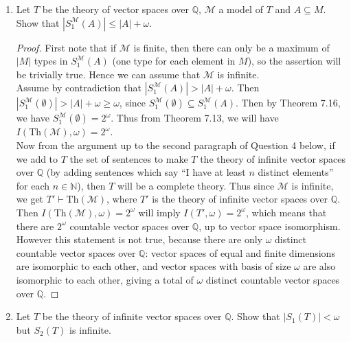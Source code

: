 \documentclass{article}
\begin{document}
\begin{enumerate}[label={\bf Q\arabic*:}]
  \item Let $T$ be the theory of vector spaces over $\mathbb{Q}$,
    $\mathcal{M}$ a model of $T$ and $A\subseteq M$. Show that
    $|S^{\mathcal{M}}_1(A)|\leq|A|+\omega$.

    \begin{proof}
      First note that if $\mathcal{M}$ is finite, then there can only be a
      maximum of $|M|$ types in $S^{\mathcal{M}}_1(A)$ (one type for each
      element in $M$), so the assertion will be trivially true. Hence we
      can assume that $\mathcal{M}$ is infinite. \\

      Assume by contradiction that $|S^{\mathcal{M}}_1(A)|>|A|+\omega$.
      Then $|S^{\mathcal{M}}_1(\emptyset)|>|A|+\omega\geq\omega$, since
      $S^{\mathcal{M}}_1(\emptyset)\subseteq S^{\mathcal{M}}_1(A)$. Then by
      Theorem 7.16, we have $S^{\mathcal{M}}_1(\emptyset)=2^\omega$. Thus
      from Theorem 7.13, we will have
      $I(\text{Th}(\mathcal{M}),\omega)=2^\omega$. \\

      Now from the argument up to the second paragraph of Question 4 below,
      if we add to $T$ the set of sentences to make $T$ the theory of
      infinite vector spaces over $\mathbb{Q}$ (by adding sentences which
      say ``I have at least $n$ distinct elements'' for each
      $n\in\mathbb{N}$), then $T$ will be a complete theory. Thus since
      $\mathcal{M}$ is infinite, we get $T'\vdash\text{Th}(\mathcal{M})$,
      where $T'$ is the theory of infinite vector spaces over $\mathbb{Q}$.
      Then $I(\text{Th}(\mathcal{M}),\omega)=2^\omega$ will imply
      $I(T',\omega)=2^\omega$, which means that there are $2^\omega$
      countable vector spaces over $\mathbb{Q}$, up to vector space
      isomorphism. However this statement is not true, because there are
      only $\omega$ distinct countable vector spaces over $\mathbb{Q}$:
      vector spaces of equal and finite dimensions are isomorphic to each
      other, and vector spaces with basis of size $\omega$ are also
      isomorphic to each other, giving a total of $\omega$ distinct
      countable vector spaces over $\mathbb{Q}$.
    \end{proof}

  \item Let $T$ be the theory of infinite vector spaces over $\mathbb{Q}$.
    Show that $|S_1(T)|<\omega$ but $S_2(T)$ is infinite.


\end{enumerate}
\end{document}

